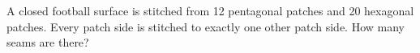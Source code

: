 A closed football surface is stitched from 12 pentagonal patches and 20 hexagonal patches. Every patch side is stitched to exactly one other patch side. How many seams are there?
